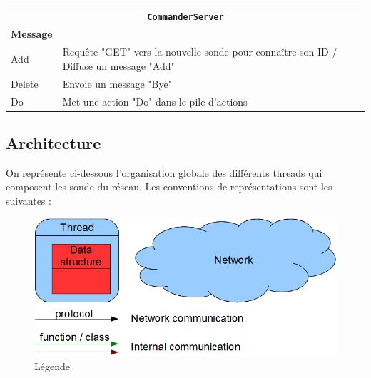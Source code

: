 \documentclass[a4paper,11pt]{article}
\newcommand{\cd}[1]{\texttt{#1}}
\begin{document}
\begin{center}
\begin{tabular}{|l|l|}
\hline
\multicolumn{2}{|c|}{\cd{CommanderServer}} \\
\hline
\textbf{Message} & \\
\hline
Add & Requête "GET" vers la nouvelle sonde pour connaître son ID / Diffuse un message "Add" \\
\hline
Delete & Envoie un message "Bye"\\
\hline
Do & Met une action "Do" dans le pile d'actions\\
\hline
\end{tabular}
\end{center}


\subsection{Architecture}

On représente ci-dessous l'organisation globale des différents threads qui composent les sonde du réseau.
Les conventions de représentations sont les suivantes :
\begin{figure}[!h]
\centering\includegraphics[width=\linewidth]{img/graphLegend.png}
\caption{Légende}
\end{figure}

\newpage
\end{document}
